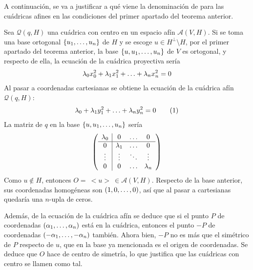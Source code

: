\documentclass[12pt]{report}
\theoremstyle{definition}
\theoremstyle{definition}
\theoremstyle{remark}
\begin{document}
A continuación, se va a justificar a qué viene la denominación de  para las cuádricas afines en las condiciones del primer apartado del teorema anterior.

\vspace{2mm}
Sea $\mathcal{Q}(q,H)$ una cuádrica con centro en un espacio afín $\mathcal{A}(V,H)$. Si se toma una base ortogonal $\{u_1,\mathellipsis,u_n\}$ de $H$ y se escoge $u \in H^\perp \setminus H$, por el primer apartado del teorema anterior, la base $\{u,u_1,\mathellipsis,u_n\}$ de $V$ es ortogonal, y respecto de ella, la ecuación de la cuádrica proyectiva sería
\[\lambda_0 x_0^2+\lambda_1 x_1^2+\mathellipsis+\lambda_n x_n^2 = 0\]
Al pasar a coordenadas cartesianas se obtiene la ecuación de la cuádrica afín $\mathcal{Q}(q,H)$:
\[\lambda_0+\lambda_1 y_1^2+\mathellipsis+\lambda_n y_n^2 = 0 \tag{1}\]
La matriz de $q$ en la base $\{u,u_1,\mathellipsis,u_n\}$ sería
\[\left( \begin{array}{c|ccc}
    \lambda_0 & 0 & \mathellipsis & 0 \\ \hline
    0 & \lambda_1 & \mathellipsis & 0 \\
    \vdots & \vdots & \ddots & \vdots \\
    0 & 0 & \mathellipsis & \lambda_n
\end{array} \right)\]
Como $u \notin H$, entonces $O = \ <u> \ \in \mathcal{A}(V,H)$. Respecto de la base anterior, sus coordenadas  homogéneas son $(1,0,\mathellipsis,0)$, así que al pasar a cartesianas quedaría una $n$-upla de ceros. 

\vspace{2mm} Además, de la ecuación de la cuádrica afín se deduce que si el punto $P$ de coordenadas $(\alpha_1,\mathellipsis,\alpha_n)$ está en la cuádrica, entonces el punto $-P$ de coordenadas $(-\alpha_1,\mathellipsis,-\alpha_n)$ también. Ahora bien, $-P$ no es más que el simétrico de $P$ respecto de $u$, que en la base ya mencionada es el origen de coordenadas. Se deduce que $O$ hace de centro de simetría, lo que justifica que las cuádricas con centro se llamen como tal.
\end{document}
